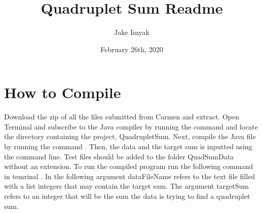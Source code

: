 \documentclass{article}
\title{Quadruplet Sum Readme}
\author{Jake Imyak }
\date{February 26th, 2020}
\begin{document}
\maketitle

\section*{How to Compile}

Download the zip of all the files submitted from Carmen and extract. Open Terminal and subscribe to the Java compiler by running the command  and locate the directory containing the project, QuadrupletSum. Next, compile the Java file by running the command . Then, the data and the target sum is inputted using the command line. Test files should be added to the folder QuadSumData without an extension. To run the compiled program run the following command in temrinal . In the following argument dataFileName refers to the text file filled with a list integers that may contain the target sum. The argument targetSum refers to an integer that will be the sum the data is trying to find a quadruplet sum.
\end{document}
